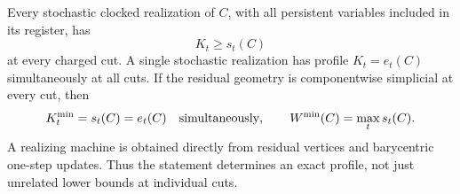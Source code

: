 \begin{theorem}\label{thm:intrinsic29}
Every stochastic clocked realization of $C$, with all persistent
variables included in its register, has
\begin{equation}\label{eq:csr-lower29}
                         K_t\ge s_t(C)
\end{equation}
at every charged cut. A single stochastic realization has profile
$K_t=e_t(C)$ simultaneously at all cuts. If the residual geometry is
componentwise simplicial at every cut, then
\begin{equation}\label{eq:csr-exact29}
             K_t^{\min}=s_t(C)=e_t(C)\quad\hbox{simultaneously},
 \qquad W^{\min}(C)=\max_t s_t(C).
\end{equation}
A realizing machine is obtained directly from residual vertices and
barycentric one-step updates. Thus the statement determines an exact
profile, not just unrelated lower bounds at individual cuts.
\end{theorem}

